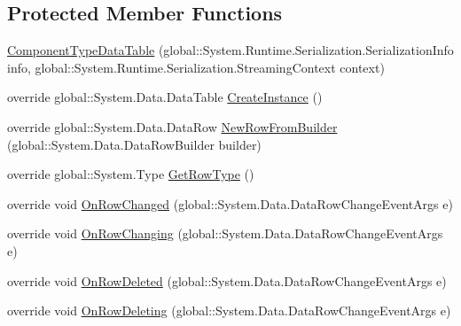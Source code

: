 \subsection*{Protected Member Functions}
\begin{DoxyCompactItemize}
\item 
\hyperlink{class_env_int_1_1_win32_1_1_field_tech_1_1_manager_1_1_data_sets_1_1_guide_ware_mobile_data_set_1_1_component_type_data_table_a997188bc3690b1470f36e4fd3ff68cd6}{Component\+Type\+Data\+Table} (global\+::\+System.\+Runtime.\+Serialization.\+Serialization\+Info info, global\+::\+System.\+Runtime.\+Serialization.\+Streaming\+Context context)
\item 
override global\+::\+System.\+Data.\+Data\+Table \hyperlink{class_env_int_1_1_win32_1_1_field_tech_1_1_manager_1_1_data_sets_1_1_guide_ware_mobile_data_set_1_1_component_type_data_table_a23faa4dbd2be8115644265331225719d}{Create\+Instance} ()
\item 
override global\+::\+System.\+Data.\+Data\+Row \hyperlink{class_env_int_1_1_win32_1_1_field_tech_1_1_manager_1_1_data_sets_1_1_guide_ware_mobile_data_set_1_1_component_type_data_table_ab70cd74f21544e385ea5ab38df6307e2}{New\+Row\+From\+Builder} (global\+::\+System.\+Data.\+Data\+Row\+Builder builder)
\item 
override global\+::\+System.\+Type \hyperlink{class_env_int_1_1_win32_1_1_field_tech_1_1_manager_1_1_data_sets_1_1_guide_ware_mobile_data_set_1_1_component_type_data_table_ade1398adf2c8c5143d6122d3432b7eb8}{Get\+Row\+Type} ()
\item 
override void \hyperlink{class_env_int_1_1_win32_1_1_field_tech_1_1_manager_1_1_data_sets_1_1_guide_ware_mobile_data_set_1_1_component_type_data_table_ad2db9b3a5d8c4e8195a08f8fd35b8ceb}{On\+Row\+Changed} (global\+::\+System.\+Data.\+Data\+Row\+Change\+Event\+Args e)
\item 
override void \hyperlink{class_env_int_1_1_win32_1_1_field_tech_1_1_manager_1_1_data_sets_1_1_guide_ware_mobile_data_set_1_1_component_type_data_table_a930e736ee3c91a992662e2a7b4faaa50}{On\+Row\+Changing} (global\+::\+System.\+Data.\+Data\+Row\+Change\+Event\+Args e)
\item 
override void \hyperlink{class_env_int_1_1_win32_1_1_field_tech_1_1_manager_1_1_data_sets_1_1_guide_ware_mobile_data_set_1_1_component_type_data_table_a5118a210129a589c1233864ed2ef9db6}{On\+Row\+Deleted} (global\+::\+System.\+Data.\+Data\+Row\+Change\+Event\+Args e)
\item 
override void \hyperlink{class_env_int_1_1_win32_1_1_field_tech_1_1_manager_1_1_data_sets_1_1_guide_ware_mobile_data_set_1_1_component_type_data_table_a8bd19d7ea77efed6555b2115eab51bf0}{On\+Row\+Deleting} (global\+::\+System.\+Data.\+Data\+Row\+Change\+Event\+Args e)

\end{DoxyCompactItemize}

